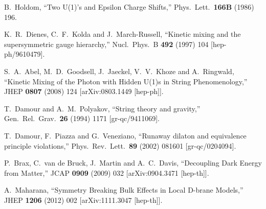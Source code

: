 \documentclass[11pt,a4paper]{article}
\begin{document}
\begin{thebibliography}{99}
  B.~Holdom,
  ``Two U(1)'s and Epsilon Charge Shifts,''
  Phys.\ Lett.\  {\bf 166B} (1986) 196.


  K.~R.~Dienes, C.~F.~Kolda and J.~March-Russell,
  ``Kinetic mixing and the supersymmetric gauge hierarchy,''
  Nucl.\ Phys.\ B {\bf 492} (1997) 104
  [hep-ph/9610479].


  S.~A.~Abel, M.~D.~Goodsell, J.~Jaeckel, V.~V.~Khoze and A.~Ringwald,
  ``Kinetic Mixing of the Photon with Hidden U(1)s in String Phenomenology,''
  JHEP {\bf 0807} (2008) 124
  [arXiv:0803.1449 [hep-ph]].


  T.~Damour and A.~M.~Polyakov,
  ``String theory and gravity,''
  Gen.\ Rel.\ Grav.\  {\bf 26} (1994) 1171
  [gr-qc/9411069].


  T.~Damour, F.~Piazza and G.~Veneziano,
  ``Runaway dilaton and equivalence principle violations,''
  Phys.\ Rev.\ Lett.\  {\bf 89} (2002) 081601
  [gr-qc/0204094].


  P.~Brax, C.~van de Bruck, J.~Martin and A.~C.~Davis,
  ``Decoupling Dark Energy from Matter,''
  JCAP {\bf 0909} (2009) 032
  [arXiv:0904.3471 [hep-th]].


  A.~Maharana,
  ``Symmetry Breaking Bulk Effects in Local D-brane Models,''
  JHEP {\bf 1206} (2012) 002
  [arXiv:1111.3047 [hep-th]].


\end{thebibliography}
\end{document}
